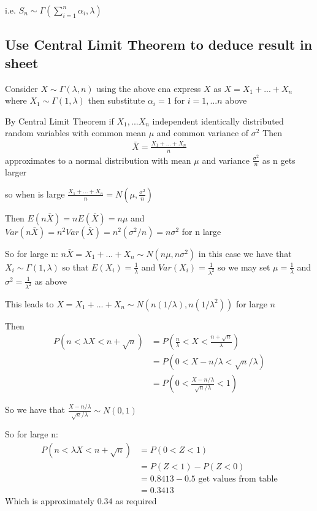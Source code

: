 \documentclass[11pt]{article}
\begin{document}
i.e. $S_{n} \sim \Gamma \left( \sum_{i=1}^{n} \alpha_{i} , \lambda \right)$

\subsection{Use Central Limit Theorem to deduce result in sheet }
Consider $X \sim \Gamma(\lambda,n)$ using the above cna express $X$ as $X = X_{1} + ... +X_{n}$ where $X_{1} \sim \Gamma(1,\lambda)$ then substitute $\alpha_{i} =1$ for $i=1,...n$ above

By Central Limit Theorem if $X_{1},...X_{n}$ independent identically distributed random variables with common mean $\mu$ and common variance of $\sigma^{2}$ Then
\begin{align*}
  \bar{X} = \frac{X_{1}+...+X_{n}}{n}
\end{align*}
approximates to a normal distribution with mean $\mu$ and variance $\frac{\sigma^{2}}{n}$ as n gets larger

so when is large $\frac{X_{1}+...+X_{n}}{n} = N \left(\mu,\frac{\sigma^{2}}{n} \right)$

Then $E(n\bar{X})= nE(\bar{X}) = n\mu$ and $Var(n\bar{X})=n^{2}Var(\bar{X}) = n^{2}(\sigma^{2} / n) = n\sigma^{2}$ for n large

So for large n: $n\bar{X}=X_{1}+...+X_{n} \sim N(n\mu,n\sigma^{2})$ in this case we have that $X_{i} \sim \Gamma(1,\lambda)$ so that $E(X_{i})=\frac{1}{\lambda}$ and $Var(X_{i}) = \frac{1}{\lambda^{2}}$ so we may set $\mu = \frac{1}{\lambda}$ and $\sigma^{2} = \frac{1}{\lambda^{2}}$
as above

This leads to $X=X_{1}+...+X_{n} \sim N(n(1/\lambda),n(1/\lambda^{2}))$ for large $n$

Then
\begin{align*}
  P(n<\lambda X < n+\sqrt{n}) &= P\left(\frac{n}{\lambda}<X<\frac{n+\sqrt{n}}{\lambda}\right)  \\
  &= P \left (0 < X - n/\lambda < \sqrt{n}/\lambda \right) \\
  &= P \left (0 < \frac{X - n/\lambda}{\sqrt{n}/\lambda} < 1 \right )
\end{align*}

So we have that $\frac{X-n/\lambda}{\sqrt{n}/\lambda} \sim N(0,1)$

So for large n:
\begin{align*}
  P(n<\lambda X < n+\sqrt{n}) &= P(0<Z<1) \\
  &= P(Z<1)-P(Z<0) \\
  &= 0.8413 -0.5  \text{ get values from table} \\
  &= 0.3413
\end{align*}
Which is approximately $\boxed{0.34}$ as required
\end{document}
